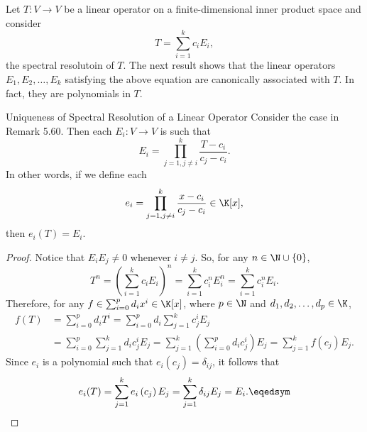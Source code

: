 \documentclass[linearalgebraII]{subfiles}
\begin{document}
    \begin{remark}
        Let $T:V\to V$ be a linear operator on a finite-dimensional inner product space and consider
        \begin{equation*}
            T = \sum^{k}_{i=1} c_iE_i,
        \end{equation*}
        the spectral resolutoin of $T$. The next result shows that the linear operators $E_1,E_2,\ldots,E_k$ satisfying the above equation are canonically associated with $T$. In fact, they are polynomials in $T$.
    \end{remark}

    \begin{cor}{Uniqueness of Spectral Resolution of a Linear Operator}
        Consider the case in Remark 5.60. Then each $E_i:V\to V$ is such that
        \begin{equation*}
            E_i = \prod^{k}_{j=1, j\neq i} \frac{T-c_i}{c_j-c_i}.
        \end{equation*}
        In other words, if we define each
        \begin{equation*}
            e_i = \prod^{k}_{j=1, j\neq i} \frac{x-c_i}{c_j-c_i}\in\K[x],
        \end{equation*}
        then $e_i(T) = E_i$.
    \end{cor}	

    \begin{proof}
        Notice that $E_iE_j\neq 0$ whenever $i\neq j$. So, for any $n\in\N\cup\left\lbrace 0 \right\rbrace$, 
        \begin{equation*}
            T^n = \left( \sum^{k}_{i=1} c_iE_i \right) ^n = \sum^{k}_{i=1} c_i^n E_i^n = \sum^{k}_{i=1} c_i^nE_i.
        \end{equation*}
        Therefore, for any $f\in \sum^{p}_{i=0} d_ix^i\in\K[x]$, where $p\in\N$ and $d_1,d_2,\ldots,d_p\in\K$,
        \begin{align*}
            f(T) & = \sum^{p}_{i=0} d_iT^i = \sum^{p}_{i=0} d_i \sum^{k}_{j=1} c_j^iE_j \\
                 & = \sum^{p}_{i=0} \sum^{k}_{j=1} d_ic_j^iE_j = \sum^{k}_{j=1} \left( \sum^{p}_{i=0} d_ic_j^i \right) E_j = \sum^{k}_{j=1} f\left( c_j \right) E_j.
        \end{align*} 
        Since $e_i$ is a polynomial such that $e_i\left( c_j \right) = \delta_{ij}$, it follows that
        \begin{equation*}
            e_i(T) = \sum^{k}_{j=1} e_i\left( c_j \right) E_j = \sum^{k}_{j=1} \delta_{ij}E_j = E_i. \eqedsym
        \end{equation*}
    \end{proof}
\end{document}
